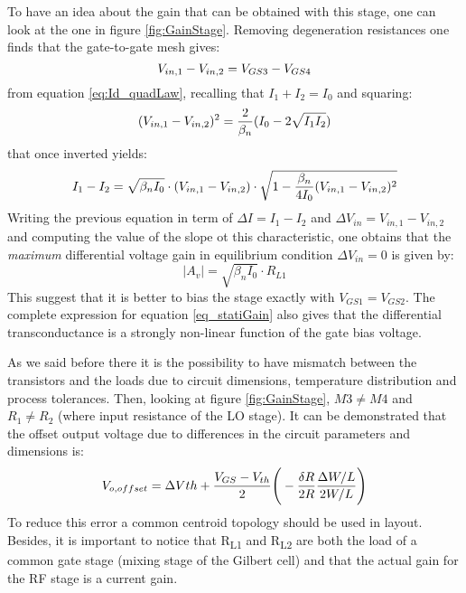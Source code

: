 To have an idea about the gain that can be obtained with this stage, one can look at the one in figure \ref{fig:GainStage}. Removing degeneration resistances one finds that the gate-to-gate mesh gives:
\begin{equation}
V_{in,1}-V_{in,2} = V_{GS3}-V_{GS4} \notag
\end{equation} 
from equation \ref{eq:Id_quadLaw}, recalling that $I_{1}+I_{2}=I_0$ and squaring:
\begin{equation}
(V_{in,1}-V_{in,2})^2 = \frac{2}{\beta_n}(I_0-2\sqrt{I_1 I_2}) \notag
\end{equation}
that once inverted yields:
\begin{equation}
I_{1}-I_{2} = \sqrt{\beta_n I_0}\cdot(V_{in,1}-V_{in,2})\cdot\sqrt{1-\frac{\beta_n}{4I_0}(V_{in,1}-V_{in,2})^2} \notag
\end{equation}
Writing the previous equation in term of $\Delta I =I_{1}-I_{2} $ and $\Delta V_{in} = V_{in,1}-V_{in,2}$ and computing the value of the slope ot this characteristic, one obtains that the \emph{maximum} differential voltage gain in equilibrium condition $\Delta V_{in} =0$ is given by:
\begin{equation}
\label{eq_statiGain}
|A_{v}|= \sqrt{\beta_{n}I_0}\cdot R_{L1}
\end{equation}
This suggest that it is better to bias the stage exactly with  $V_{GS1}=V_{GS2}$. The complete expression for equation \ref{eq_statiGain} also gives that the differential transconductance is a strongly non-linear function of the gate bias voltage. 

As we said before there it is the possibility to have mismatch between the transistors and the loads due to circuit dimensions, temperature distribution and process tolerances. Then, looking at figure \ref{fig:GainStage}, $M3 \neq M4$ and $R_1 \neq R_2$ (where input resistance of the LO stage). It can be demonstrated that the offset output voltage due to differences in the circuit parameters and dimensions is:
\begin{equation}
V_{o,offset}= \Delta V{th}+\frac{V_{GS}-V_{th}}{2}\Bigg(-\frac{\delta R}{2R}\frac{\Delta W /L}{2W/L}\Bigg) \notag
\end{equation}
To reduce this error a common centroid topology should be used in layout.
Besides, it is important to notice that R\textsubscript{L1} and R\textsubscript{L2} are both the load of a common gate stage (mixing stage of the Gilbert cell) and that the actual gain for the RF stage is a current gain. 

